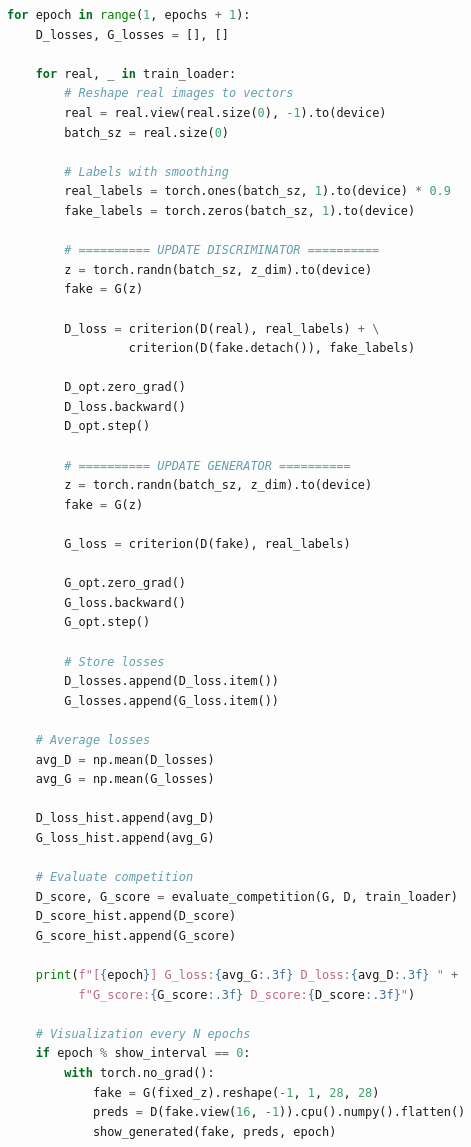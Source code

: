 \documentclass[12pt,a4paper]{article}
\begin{document}
\begin{lstlisting}[language=Python, caption=Main GAN training loop (core algorithm)]
for epoch in range(1, epochs + 1):
    D_losses, G_losses = [], []
    
    for real, _ in train_loader:
        # Reshape real images to vectors
        real = real.view(real.size(0), -1).to(device)
        batch_sz = real.size(0)
        
        # Labels with smoothing
        real_labels = torch.ones(batch_sz, 1).to(device) * 0.9
        fake_labels = torch.zeros(batch_sz, 1).to(device)
        
        # ========== UPDATE DISCRIMINATOR ==========
        z = torch.randn(batch_sz, z_dim).to(device)
        fake = G(z)
        
        D_loss = criterion(D(real), real_labels) + \
                 criterion(D(fake.detach()), fake_labels)
        
        D_opt.zero_grad()
        D_loss.backward()
        D_opt.step()
        
        # ========== UPDATE GENERATOR ==========
        z = torch.randn(batch_sz, z_dim).to(device)
        fake = G(z)
        
        G_loss = criterion(D(fake), real_labels)
        
        G_opt.zero_grad()
        G_loss.backward()
        G_opt.step()
        
        # Store losses
        D_losses.append(D_loss.item())
        G_losses.append(G_loss.item())
    
    # Average losses
    avg_D = np.mean(D_losses)
    avg_G = np.mean(G_losses)
    
    D_loss_hist.append(avg_D)
    G_loss_hist.append(avg_G)
    
    # Evaluate competition
    D_score, G_score = evaluate_competition(G, D, train_loader)
    D_score_hist.append(D_score)
    G_score_hist.append(G_score)
    
    print(f"[{epoch}] G_loss:{avg_G:.3f} D_loss:{avg_D:.3f} " + 
          f"G_score:{G_score:.3f} D_score:{D_score:.3f}")
    
    # Visualization every N epochs
    if epoch % show_interval == 0:
        with torch.no_grad():
            fake = G(fixed_z).reshape(-1, 1, 28, 28)
            preds = D(fake.view(16, -1)).cpu().numpy().flatten()
            show_generated(fake, preds, epoch)
\end{lstlisting}
\end{document}

